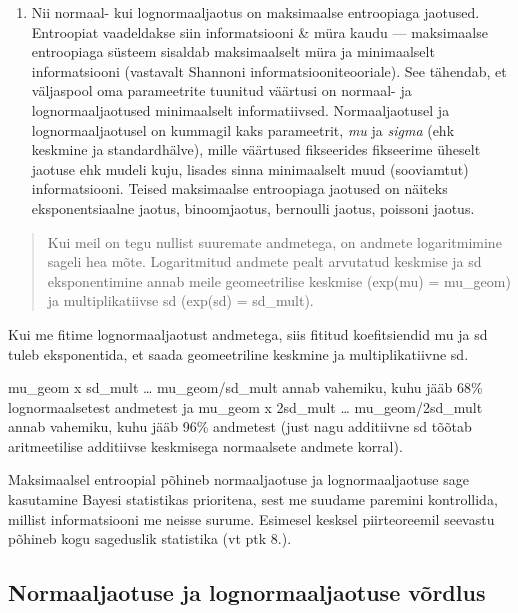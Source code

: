 \documentclass[]{book}
\providecommand{\tightlist}{%
  \setlength{\itemsep}{0pt}\setlength{\parskip}{0pt}}
\begin{document}
\begin{enumerate}
\def\labelenumi{(\arabic{enumi})}
\setcounter{enumi}{1}
\tightlist
\item
  Nii normaal- kui lognormaaljaotus on maksimaalse entroopiaga jaotused.
  Entroopiat vaadeldakse siin informatsiooni \& müra kaudu ---
  maksimaalse entroopiaga süsteem sisaldab maksimaalselt müra ja
  minimaalselt informatsiooni (vastavalt Shannoni
  informatsiooniteooriale). See tähendab, et väljaspool oma parameetrite
  tuunitud väärtusi on normaal- ja lognormaaljaotused minimaalselt
  informatiivsed. Normaaljaotusel ja lognormaaljaotusel on kummagil kaks
  parameetrit, \emph{mu} ja \emph{sigma} (ehk keskmine ja
  standardhälve), mille väärtused fikseerides fikseerime üheselt jaotuse
  ehk mudeli kuju, lisades sinna minimaalselt muud (sooviamtut)
  informatsiooni. Teised maksimaalse entroopiaga jaotused on näiteks
  eksponentsiaalne jaotus, binoomjaotus, bernoulli jaotus, poissoni
  jaotus.
\end{enumerate}

\begin{quote}
Kui meil on tegu nullist suuremate andmetega, on andmete logaritmimine
sageli hea mõte. Logaritmitud andmete pealt arvutatud keskmise ja sd
eksponentimine annab meile geomeetrilise keskmise (exp(mu) = mu\_geom)
ja multiplikatiivse sd (exp(sd) = sd\_mult).
\end{quote}

Kui me fitime lognormaaljaotust andmetega, siis fititud koefitsiendid mu
ja sd tuleb eksponentida, et saada geomeetriline keskmine ja
multiplikatiivne sd.

mu\_geom x sd\_mult \ldots{} mu\_geom/sd\_mult annab vahemiku, kuhu jääb
68\% lognormaalsetest andmetest ja mu\_geom x 2sd\_mult \ldots{}
mu\_geom/2sd\_mult annab vahemiku, kuhu jääb 96\% andmetest (just nagu
additiivne sd tõõtab aritmeetilise additiivse keskmisega normaalsete
andmete korral).

Maksimaalsel entroopial põhineb normaaljaotuse ja lognormaaljaotuse sage
kasutamine Bayesi statistikas prioritena, sest me suudame paremini
kontrollida, millist informatsiooni me neisse surume. Esimesel kesksel
piirteoreemil seevastu põhineb kogu sageduslik statistika (vt ptk 8.).

\subsection{Normaaljaotuse ja lognormaaljaotuse
võrdlus}\label{normaaljaotuse-ja-lognormaaljaotuse-vordlus}
\end{document}
